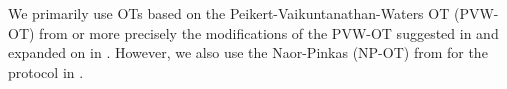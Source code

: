 \documentclass[a4paper,11pt]{article}
\begin{document}
			We primarily use OTs based on the Peikert-Vaikuntanathan-Waters OT (PVW-OT) from \cite{PVW_OT_2008} or more precisely the modifications of the PVW-OT suggested in \cite{LindellAndPinkas2011} and expanded on in \cite{Lindell_CnC_2013}. However, we also use the Naor-Pinkas (NP-OT) from \cite{NaorPinkasOT2001} for the protocol in \cite{Katz_Symm_CnC_2013}.





\end{document}
